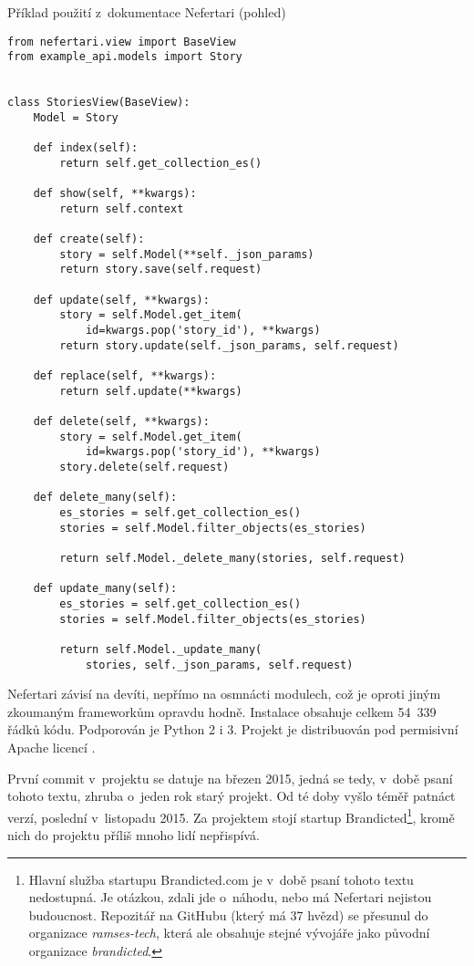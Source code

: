 \begin{listing}[htbp]
\caption{{\label{code:nefertariview}Příklad použití z~dokumentace Nefertari (pohled) \autocite{nefertariview}}}
\begin{verbatim}
from nefertari.view import BaseView
from example_api.models import Story


class StoriesView(BaseView):
    Model = Story

    def index(self):
        return self.get_collection_es()

    def show(self, **kwargs):
        return self.context

    def create(self):
        story = self.Model(**self._json_params)
        return story.save(self.request)

    def update(self, **kwargs):
        story = self.Model.get_item(
            id=kwargs.pop('story_id'), **kwargs)
        return story.update(self._json_params, self.request)

    def replace(self, **kwargs):
        return self.update(**kwargs)

    def delete(self, **kwargs):
        story = self.Model.get_item(
            id=kwargs.pop('story_id'), **kwargs)
        story.delete(self.request)

    def delete_many(self):
        es_stories = self.get_collection_es()
        stories = self.Model.filter_objects(es_stories)

        return self.Model._delete_many(stories, self.request)

    def update_many(self):
        es_stories = self.get_collection_es()
        stories = self.Model.filter_objects(es_stories)

        return self.Model._update_many(
            stories, self._json_params, self.request)
\end{verbatim}
\end{listing}

Nefertari závisí na devíti, nepřímo na osmnácti modulech, což je oproti jiným zkoumaným frameworkům opravdu hodně. Instalace obsahuje celkem 54~339 řádků kódu. Podporován je Python 2 i 3. Projekt je distribuován pod permisivní Apache licencí \autocite{apache}.

První commit v~projektu se datuje na březen 2015, jedná se tedy, v~době psaní tohoto textu, zhruba o~jeden rok starý projekt. Od té doby vyšlo téměř patnáct verzí, poslední v~listopadu 2015. Za projektem stojí startup Brandicted\footnote{Hlavní služba startupu Brandicted.com je v~době psaní tohoto textu nedostupná. Je otázkou, zdali jde o~náhodu, nebo má Nefertari nejistou budoucnost. Repozitář na GitHubu (který má 37 hvězd) se přesunul do organizace \emph{ramses-tech}, která ale obsahuje stejné vývojáře jako původní organizace \emph{brandicted}.}, kromě nich do projektu příliš mnoho lidí nepřispívá.


